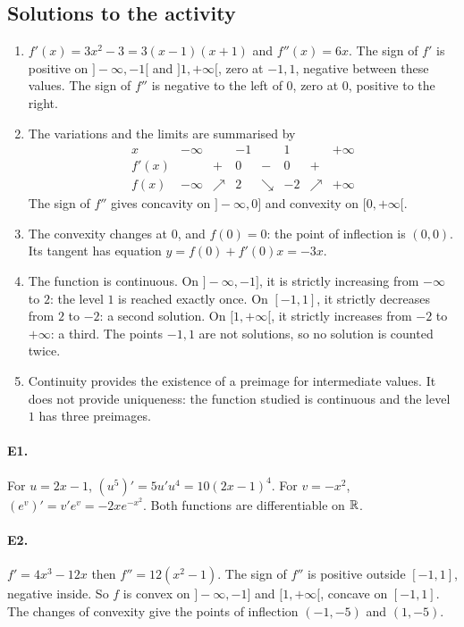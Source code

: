 \subsection{Solutions to the activity}\begin{enumerate}
\item $f'(x)=3x^2-3=3(x-1)(x+1)$ and $f''(x)=6x$. The sign of $f'$ is positive on $]-\infty,-1[$ and $]1,+\infty[$, zero at $-1,1$, negative between these values. The sign of $f''$ is negative to the left of $0$, zero at $0$, positive to the right.
\item The variations and the limits are summarised by
\[\begin{array}{c|ccccccc}x&-\infty&&-1&&1&&+\infty\\\hline f'(x)&&+&0&-&0&+&\\\hline f(x)&-\infty&\nearrow&2&\searrow&-2&\nearrow&+\infty\end{array}\]
The sign of $f''$ gives concavity on $]-\infty,0]$ and convexity on $[0,+\infty[$.
\item The convexity changes at $0$, and $f(0)=0$: the point of inflection is $(0,0)$. Its tangent has equation $y=f(0)+f'(0)x=-3x$.
\item The function is continuous. On $]-\infty,-1]$, it is strictly increasing from $-\infty$ to $2$: the level $1$ is reached exactly once. On $[-1,1]$, it strictly decreases from $2$ to $-2$: a second solution. On $[1,+\infty[$, it strictly increases from $-2$ to $+\infty$: a third. The points $-1,1$ are not solutions, so no solution is counted twice.
\item Continuity provides the existence of a preimage for intermediate values. It does not provide uniqueness: the function studied is continuous and the level $1$ has three preimages.
\end{enumerate}

\paragraph{E1.}For $u=2x-1$, $(u^5)'=5u' u^4=10(2x-1)^4$. For $v=-x^2$, $(e^v)'=v' e^v=-2xe^{-x^2}$. Both functions are differentiable on $\mathbb R$.

\paragraph{E2.}$f'=4x^3-12x$ then $f''=12(x^2-1)$. The sign of $f''$ is positive outside $[-1,1]$, negative inside. So $f$ is convex on $]-\infty,-1]$ and $[1,+\infty[$, concave on $[-1,1]$. The changes of convexity give the points of inflection $(-1,-5)$ and $(1,-5)$.

